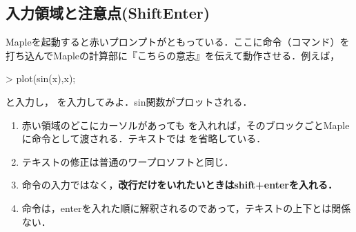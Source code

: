 \subsection{入力領域と注意点(ShiftEnter)}
Mapleを起動すると赤いプロンプトがともっている．ここに命令（コマンド）を打ち込んでMapleの計算部に『こちらの意志』を伝えて動作させる．例えば，
\begin{MapleInput}
> plot(sin(x),x); 
\end{MapleInput}
と入力し，
\ifHIKI
[ Enter ]
\else
{}
\fi
を入力してみよ．sin関数がプロットされる．
\begin{enumerate}
\item 赤い領域のどこにカーソルがあっても
\ifHIKI
[ Enter ]
\else
{}
\fi
を入れれば，そのブロックごとMapleに命令として渡される．テキストでは
\ifHIKI
[ Enter ]
\else
{}
\fi
を省略している．
\item テキストの修正は普通のワープロソフトと同じ．
\item 命令の入力ではなく，\textbf{改行だけをいれたいときはshift+enterを入れる．}
\item 命令は，enterを入れた順に解釈されるのであって，テキストの上下とは関係ない．
\end{enumerate}
